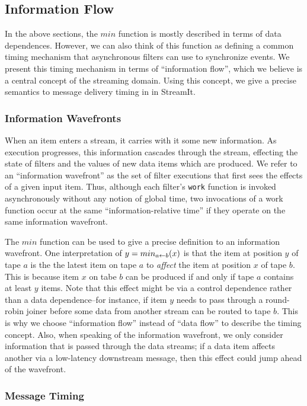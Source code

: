 \subsection{Information Flow}

In the above sections, the $min$ function is mostly described in terms
of data dependences.  However, we can also think of this function as
defining a common timing mechanism that asynchronous filters can use
to synchronize events.  We present this timing mechanism in terms of
``information flow'', which we believe is a central concept of the
streaming domain.  Using this concept, we give a precise semantics to
message delivery timing in in StreamIt.

\subsubsection{Information Wavefronts}

When an item enters a stream, it carries with it some new information.
As execution progresses, this information cascades through the stream,
effecting the state of filters and the values of new data items which
are produced.  We refer to an ``information wavefront'' as the set of
filter executions that first sees the effects of a given input item.
Thus, although each filter's {\tt work} function is invoked
asynchronously without any notion of global time, two invocations of a
work function occur at the same ``information-relative time'' if they
operate on the same information wavefront.

The $min$ function can be used to give a precise definition to an
information wavefront.  One interpretation of $y = min_{a \leftarrow b}(x)$ is
that the item at position $y$ of tape $a$ is the the latest item on
tape $a$ to {\it affect} the item at position $x$ of tape $b$.  This
is because item $x$ on tabe $b$ can be produced if and only if tape
$a$ contains at least $y$ items.  Note that this effect might be via a
control dependence rather than a data dependence--for instance, if
item $y$ needs to pass through a round-robin joiner before some data
from another stream can be routed to tape $b$.  This is why we choose
``information flow'' instead of ``data flow'' to describe the timing
concept.  Also, when speaking of the information wavefront, we only
consider information that is passed through the data streams; if a
data item affects another via a low-latency downstream message, then
this effect could jump ahead of the wavefront.

\subsubsection{Message Timing}

